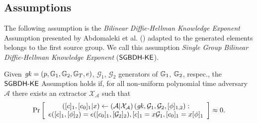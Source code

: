 \subsection{Assumptions}

The following assumption is the \emph{Bilinear Diffie-Hellman Knowledge Exponent} Assumption presented by Abdomaleki et al. (\cite{AC:ABLZ17}) adapted to the generated elements belongs to the first source group. We call this assumption \emph{Single Group Bilinear Diffie-Hellman Knowledge Exponent} ($\mathsf{SGBDH\mbox{-}KE}$).

\begin{assumption} Given $\mathit{gk}=(p,\mathbb{G}_1,\mathbb{G}_2,\mathbb{G}_T,e)$, $\mathcal{G}_1$, $\mathcal{G}_2$ generators of $\mathbb{G}_1$, $\mathbb{G}_2$, respec., the $\mathsf{SGBDH\mbox{-}KE}$ Assumption holds if, for all non-uniform polynomial time adversary $\mathcal{A}$ there exists an extractor $\mathcal{X}_{\mathcal{A}}$ such that
	$$\text{Pr}\left[
	\begin{array}{c}
	\left([c]_1,[c_0]_1|x\right)\gets \left(\mathcal{A}|\mathcal{X}_{\mathcal{A}}\right)\left(\mathit{gk},\mathcal{G}_1,\mathcal{G}_2,[\phi]_{1,2}\right):\\
	e([c]_1,[\phi]_2)=e([c_0]_1,[\mathcal{G}_2]_2), [c]_1=x \mathcal{G}_1, [c_0]_1=x [\phi]_1
	\end{array}\right] \approx 0.$$
\end{assumption}